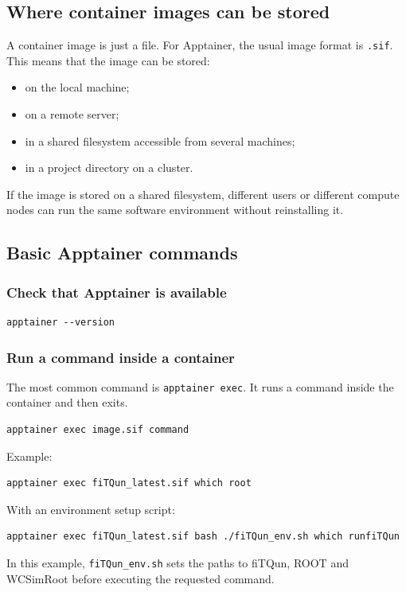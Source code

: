 \documentclass{article}
\numberwithin{table}{subsection}
\numberwithin{figure}{subsection}
\numberwithin{equation}{subsection}
\numberwithin{footnote}{subsection}
\begin{document}
\subsection{Where container images can be stored}

A container image is just a file. For Apptainer, the usual image format is
\texttt{.sif}. This means that the image can be stored:

\begin{itemize}
    \item on the local machine;
    \item on a remote server;
    \item in a shared filesystem accessible from several machines;
    \item in a project directory on a cluster.
\end{itemize}
If the image is stored on a shared filesystem, different users or different
compute nodes can run the same software environment without reinstalling it.

\subsection{Basic Apptainer commands}

\subsubsection{Check that Apptainer is available}

\begin{lstlisting}[style=terminal]
apptainer --version
\end{lstlisting}

\subsubsection{Run a command inside a container}

The most common command is \texttt{apptainer exec}. It runs a command inside the
container and then exits.

\begin{lstlisting}[style=terminal]
apptainer exec image.sif command
\end{lstlisting}
Example:
\begin{lstlisting}[style=terminal]
apptainer exec fiTQun_latest.sif which root
\end{lstlisting}
With an environment setup script:
\begin{lstlisting}[style=terminal]
apptainer exec fiTQun_latest.sif bash ./fiTQun_env.sh which runfiTQun
\end{lstlisting}
In this example, \texttt{fiTQun\_env.sh} sets the paths to fiTQun, ROOT and
WCSimRoot before executing the requested command.
\end{document}
